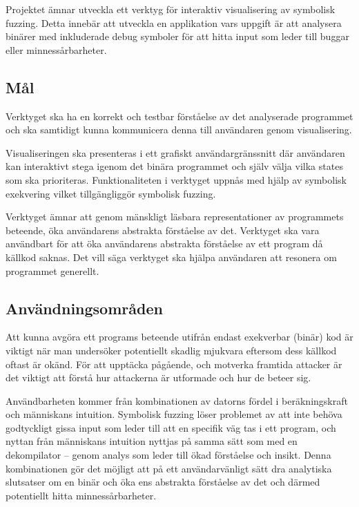 
Projektet ämnar utveckla ett verktyg för interaktiv visualisering av symbolisk
fuzzing. Detta innebär att utveckla en applikation vars uppgift är att analysera
binärer med inkluderade debug symboler för att hitta input som leder till
buggar eller minnessårbarheter.

\subsection{Mål}
Verktyget ska ha en korrekt och testbar förståelse av det analyserade programmet
och ska samtidigt kunna kommunicera denna till användaren genom visualisering.

Visualiseringen ska presenteras i ett grafiskt användargränssnitt där användaren
kan interaktivt stega igenom det binära programmet och själv välja vilka states
som ska prioriteras. Funktionaliteten i verktyget uppnås
med hjälp av symbolisk exekvering vilket tillgängliggör symbolisk fuzzing.

Verktyget ämnar att genom mänskligt läsbara representationer av programmets 
beteende, öka användarens abstrakta förståelse av det. Verktyget ska vara 
användbart för att öka användarens abstrakta förståelse av ett program då källkod 
saknas. Det vill säga verktyget ska hjälpa användaren att resonera om programmet 
generellt. 

\subsection{Användningsområden}
Att kunna avgöra ett programs beteende utifrån endast exekverbar (binär) 
kod är viktigt när man undersöker potentiellt skadlig mjukvara eftersom
dess källkod oftast är okänd. För att upptäcka pågående, och motverka 
framtida attacker är det viktigt att förstå hur attackerna är utformade och
hur de beteer sig. 

Användbarheten kommer från kombinationen av datorns fördel i beräkningskraft
och människans intuition. Symbolisk fuzzing löser problemet av att inte behöva godtyckligt
gissa input som leder till att en specifik väg tas i ett program, och nyttan från människans
intuition nyttjas på samma sätt som med en dekompilator -- genom analys som
leder till ökad förståelse och insikt. Denna kombinationen gör det möjligt att på ett
användarvänligt sätt dra analytiska slutsatser om en binär och öka ens abstrakta
förståelse av det och därmed potentiellt hitta minnessårbarheter.
